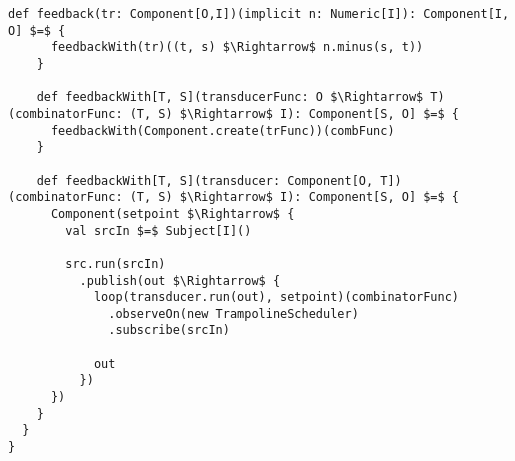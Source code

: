 \begin{lstlisting}[style=ScalaStyle, caption={Operators on \comp}, label={lst:component-operators}]
    def feedback(tr: Component[O,I])(implicit n: Numeric[I]): Component[I, O] $=$ {
      feedbackWith(tr)((t, s) $\Rightarrow$ n.minus(s, t))
    }

    def feedbackWith[T, S](transducerFunc: O $\Rightarrow$ T)                         (combinatorFunc: (T, S) $\Rightarrow$ I): Component[S, O] $=$ {
      feedbackWith(Component.create(trFunc))(combFunc)
    }

    def feedbackWith[T, S](transducer: Component[O, T])                  (combinatorFunc: (T, S) $\Rightarrow$ I): Component[S, O] $=$ {
      Component(setpoint $\Rightarrow$ {
        val srcIn $=$ Subject[I]()

        src.run(srcIn)
          .publish(out $\Rightarrow$ {
            loop(transducer.run(out), setpoint)(combinatorFunc)
              .observeOn(new TrampolineScheduler)
              .subscribe(srcIn)

            out
          })
      })
    }
  }
}
\end{lstlisting}